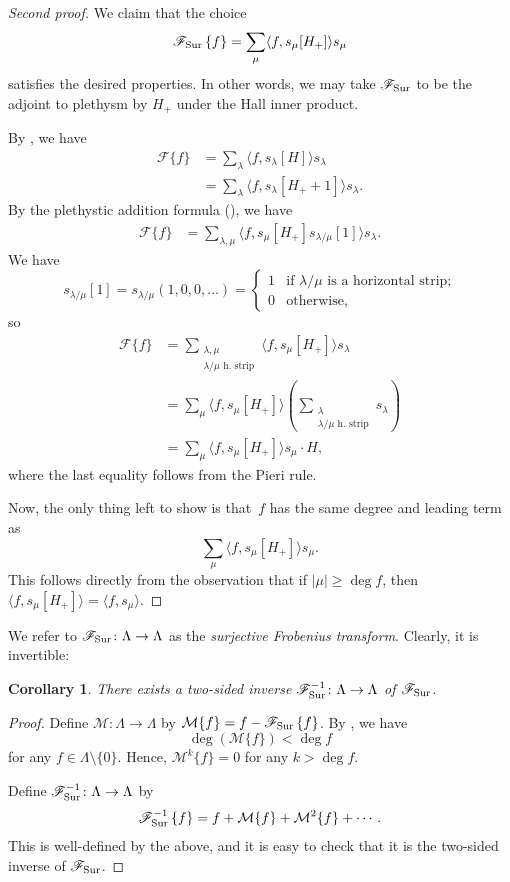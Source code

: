 \documentclass[11pt]{article}
\newtheorem{coro}[theo]{Corollary}
\theoremstyle{definition}
\numberwithin{equation}{section}
\newcommand{\Fa}{\mathscr{F}}
\newcommand{\Sur}{\mathchoice{\operatorname{Sur}}{\operatorname{Sur}}{\mathrm{Sur}}{\mathrm{Sur}}}
\newcommand{\F}[1]{\mathscr{F}\{#1\}}
\newcommand{\FSur}[1]{\mathscr{F}_{\Sur}\left\{#1\right\}}
\newcommand{\FSurInv}[1]{\mathscr{F}_{\Sur}^{-1}\left\{#1\right\}}
\begin{document}
\begin{proof}[Second proof]
We claim that the choice
\[\FSur{f} = \sum_{\mu} \langle f, s_\mu[H_+]\rangle s_\mu\] satisfies the desired properties. In other words, we may take $\Fa_{\Sur}$ to be the adjoint to plethysm by $H_+$ under the Hall inner product.

By , we have
\begin{align*}
    \F{f} &= \sum_{\lambda} \langle f, s_\lambda[H]\rangle s_\lambda \\
    &= \sum_{\lambda} \langle f, s_\lambda[H_+ + 1]\rangle s_\lambda.
\end{align*}
By the plethystic addition formula (), we have
\begin{align*}
    \F{f} &= \sum_{\lambda, \mu} \langle f, s_\mu[H_+] s_{\lambda / \mu}[1]\rangle s_\lambda.
\end{align*}
We have \[s_{\lambda / \mu}[1] = s_{\lambda / \mu}(1, 0, 0, \ldots) = \begin{cases} 1 & \mbox{if $\lambda / \mu$ is a horizontal strip;} \\ 0 & \mbox{otherwise,}\end{cases}\] so 
\begin{align*}
    \F{f} &= \sum_{\substack{\lambda, \mu \\ \text{$\lambda/\mu$ h. strip}}} \langle f, s_\mu[H_+]\rangle s_\lambda \\
    &= \sum_{\mu}\langle f, s_\mu[H_+] \rangle \left(\sum_{\substack{\lambda \\ \text{$\lambda/\mu$ h. strip}}}s_\lambda\right) \\
    &= \sum_{\mu}\langle f, s_\mu[H_+] \rangle s_\mu \cdot H,
\end{align*}
where the last equality follows from the Pieri rule.

Now, the only thing left to show is that~$f$ has the same degree and leading term as \[\sum_{\mu} \langle f, s_\mu[H_+]\rangle s_\mu.\] This follows directly from the observation that if $|\mu| \geq \deg f$, then $\langle f, s_\mu[H_+]\rangle = \langle f, s_\mu\rangle$.
\end{proof}
We refer to $\Fa_{\Sur} \colon \Lambda \to \Lambda$ as the \emph{surjective Frobenius transform}. Clearly, it is invertible:
\begin{coro}
    There exists a two-sided inverse $\Fa_{\Sur}^{-1} \colon \Lambda \to \Lambda$ of $\Fa_{\Sur}$.
\end{coro}
\begin{proof}
    Define $\mathcal{M} \colon \Lambda \to \Lambda$ by $\mathcal{M}\{f\} = f - \FSur{f}$. By , we have \[\deg(\mathcal{M}\{f\}) < \deg f\] for any $f \in \Lambda \setminus \{0\}$. Hence, $\mathcal{M}^k\{f\} = 0$ for any $k > \deg f$.

    Define $\Fa_{\Sur}^{-1} \colon \Lambda \to \Lambda$ by \[\FSurInv{f} = f + \mathcal{M}\{f\} + \mathcal{M}^2\{f\} + \cdots.\] This is well-defined by the above, and it is easy to check that it is the two-sided inverse of $\Fa_{\Sur}$.
\end{proof}
\end{document}
